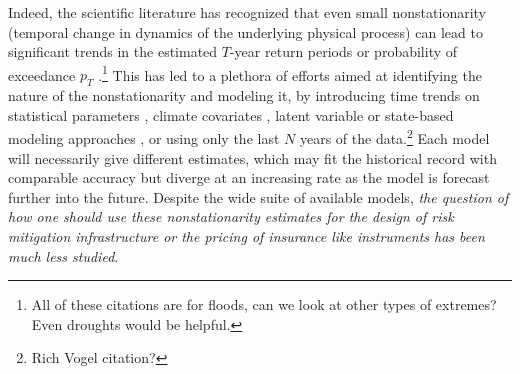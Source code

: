 \documentclass[12pt]{article}
\begin{document}
Indeed, the scientific literature has recognized that even small nonstationarity (temporal change in dynamics of the underlying physical process) can lead to significant trends in the estimated $T$-year return periods or probability of exceedance $p_T$ \citep{Milly2008,Vogel2011,Salas2014,Merz2014,Obeysekera2016}.\footnote{All of these citations are for floods, can we look at other types of extremes? Even droughts would be helpful.}
This has led to a plethora of efforts aimed at identifying the nature of the nonstationarity and modeling it, \eg{} by introducing time trends on statistical parameters \citep{Strupczewski2001,Vogel2011,Obeysekera2014,Serinaldi2015}, climate covariates \citep{Delgado2014,Griffis2007,Silva2016,Sun2014,Hall2014}, latent variable or state-based modeling approaches \citep{Griffis2007,Sveinsson2005,Waylen1986}, or using only the last $N$ years of the data.\footnote{Rich Vogel citation?}
Each model will necessarily give different estimates, which may fit the historical record with comparable accuracy but diverge at an increasing rate as the model is forecast further into the future.
Despite the wide suite of available models, \emph{the question of how one should use these nonstationarity estimates for the design of risk mitigation infrastructure or the pricing of insurance like instruments has been much less studied}.
\end{document}
